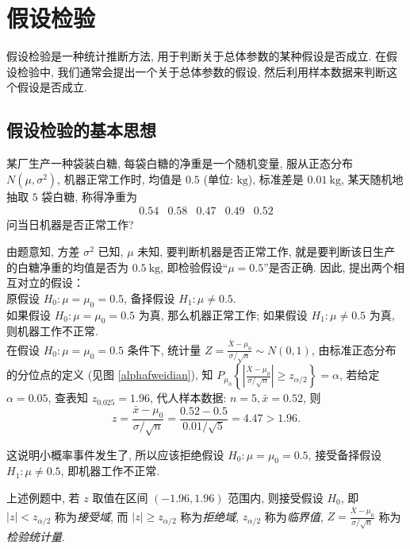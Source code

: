 \section{假设检验}

假设检验是一种统计推断方法, 用于判断关于总体参数的某种假设是否成立. 在假设检验中, 我们通常会提出一个关于总体参数的假设, 然后利用样本数据来判断这个假设是否成立.

\subsection{假设检验的基本思想}

\begin{example}
    某厂生产一种袋装白糖, 每袋白糖的净重是一个随机变量, 服从正态分布 $ N\left(\mu, \sigma^{2}\right)$, \label{baitjq}
    机器正常工作时, 均值是 $0.5$ (单位: $ \mathrm{kg}$), 标准差是 $ 0.01 \mathrm{~kg}$, 某天随机地抽取 $5$ 袋白糖, 称得净重为
    $$\begin{array}{lllll}
            0.54 & 0.58 & 0.47 & 0.49 & 0.52
        \end{array}$$
    问当日机器是否正常工作?
\end{example}
\begin{solution}
    由题意知, 方差 $ \sigma^{2} $ 已知, $\mu $ 未知, 要判断机器是否正常工作, 就是要判断该日生产的白糖净重的均值是否为 $ 0.5 \mathrm{~kg} $,
    即检验假设“$\mu=0.5$”是否正确. 因此, 提出两个相互对立的假设：\\
    原假设 $ H_{0}: \mu=\mu_{0}=0.5 $, 备择假设 $ H_{1}: \mu \neq 0.5 .$\\
    如果假设 $ H_{0}: \mu=\mu_{0}=0.5 $ 为真, 那么机器正常工作; 如果假设 $ H_{1}: \mu \neq 0.5 $ 为真, 则机器工作不正常.\\
    在假设 $ H_{0}: \mu=\mu_{0}=0.5 $ 条件下, 统计量 $\displaystyle Z=\frac{\bar{X}-\mu_{0}}{\sigma / \sqrt{n}} \sim N(0,1) $,
    由标准正态分布的分位点的定义 (见图 \ref{alphafweidian}), 知 $ P_{\mu_{0}}\left\{\left|\frac{\bar{X}-\mu_{0}}{\sigma / \sqrt{n}}\right| \geqslant z_{\alpha / 2}\right\}=\alpha $,
    若给定 $ \alpha=0.05$, 查表知 $ z_{0.025}=1.96$, 代人样本数据: $ n=5, \bar{x}=0.52 $,
    则 $$\displaystyle z=\frac{\bar{x}-\mu_{0}}{\sigma / \sqrt{n}}=\frac{0.52-0.5}{0.01 / \sqrt{5}}=4.47>1.96 .$$

    这说明小概率事件发生了, 所以应该拒绝假设 $ H_{0}: \mu=\mu_{0}=0.5 $, 接受备择假设 $ H_{1}: \mu \neq 0.5 $, 即机器工作不正常.
\end{solution}

\begin{definition}[接收域和拒绝域]
    上述例题中, 若 $ z $ 取值在区间 $ (-1.96,1.96) $ 范围内, 则接受假设 $ H_{0} $, 即 $ |z|<z_{\alpha / 2} $ 称为\textit{接受域},
    而 $ |z| \geqslant z_{\alpha / 2} $ 称为\textit{拒绝域}, $z_{\alpha / 2} $ 称为\textit{临界值}, $\displaystyle Z=\frac{\bar{X}-\mu_{0}}{\sigma / \sqrt{n}} $ 称为\textit{检验统计量}.
\end{definition}

